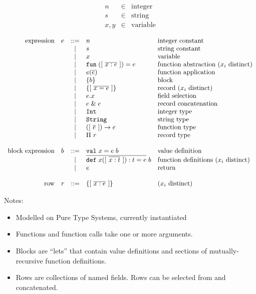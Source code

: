 \documentclass[11pt]{article}
\begin{document}
\[
\begin{array}{lcl}
n & \in & \text{integer} \\
s & \in & \text{string} \\
x, y & \in & \text{variable} \\
\end{array}
\]
\[
\begin{array}{rlcll}
\text{expression}
  & e & ::= & n                      & \text{integer constant} \\
  &   & |   & s                      & \text{string constant} \\
  &   & |   & x                      & \text{variable} \\
  &   & |   & \mathtt{fun}\;([\ \overline{x : e}\ ]) = e  & \text{function abstraction ($x_i$ distinct)} \\
  &   & |   & e(\overline{e})            & \text{function application} \\
  &   & |   & \{ b \}                      & \text{block} \\
  &   & |   & \{ [\ \overline{x = e}\ ] \}                   & \text{record ($x_i$ distinct)} \\
  &   & |   & e . x                   & \text{field selection} \\
  &   & |   & e\;\&\;e                   & \text{record concatenation} \\
  &   & |   & \mathtt{Int}                        & \text{integer type} \\
  &   & |   & \mathtt{String}                        & \text{string type} \\
  &   & |   & ([\ \overline{e}\ ]) -> e           & \text{function type} \\
  &   & |   & \Pi\ r                     & \text{record type} \\
\\
\text{block expression}
  & b & ::= & \mathtt{val}\;x = e\;b                 & \text{value definition} \\
  &   & |   & \overline{\mathtt{def}\;x([\ \overline{x : t}\ ]) : t = e}\;b   & \text{function definitions ($x_i$ distinct)} \\
  &   & |   & e                       & \text{return} \\
\\
\text{row}
  & r & ::= & \{ [\ \overline{x : e}\ ] \}       & \text{($x_i$ distinct)}
\end{array}
\]

Notes:
\begin{itemize}
\item Modelled on Pure Type Systems, currently instantiated
\item Functions and function calls take one or more arguments.
\item Blocks are ``lets'' that contain value definitions and sections of mutually-recursive function definitions.
\item Rows are collections of named fields. Rows can be selected from and concatenated.
\end{itemize}
\end{document}
